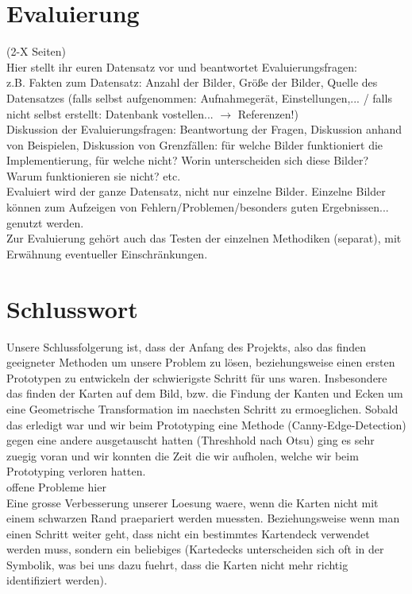\documentclass[paper=A4, deutsch]{scrartcl}
\begin{document}
\section{Evaluierung}
(2-X Seiten)\\
Hier stellt ihr euren Datensatz vor und beantwortet Evaluierungsfragen:\\
z.B. Fakten zum Datensatz: Anzahl der Bilder, Größe der Bilder, Quelle des Datensatzes (falls selbst aufgenommen: Aufnahmegerät, Einstellungen,... / falls nicht selbst erstellt: Datenbank vostellen... $\to$ Referenzen!)\\
Diskussion der Evaluierungsfragen: Beantwortung der Fragen, Diskussion anhand von Beispielen, Diskussion von Grenzfällen: für welche Bilder funktioniert die Implementierung, für welche nicht? Worin unterscheiden sich diese Bilder? Warum funktionieren sie nicht? etc.\\
Evaluiert wird der ganze Datensatz, nicht nur einzelne Bilder. Einzelne Bilder können zum Aufzeigen von Fehlern/Problemen/besonders guten Ergebnissen... genutzt werden.\\
Zur Evaluierung gehört auch das Testen der einzelnen Methodiken (separat), mit Erwähnung eventueller Einschränkungen.

\section{Schlusswort}
Unsere Schlussfolgerung ist, dass der Anfang des Projekts, also das finden geeigneter Methoden um unsere Problem zu lösen,
beziehungsweise einen ersten Prototypen zu entwickeln der schwierigste Schritt für uns waren. Insbesondere das finden der Karten
auf dem Bild, bzw. die Findung der Kanten und Ecken um eine Geometrische Transformation im naechsten Schritt zu ermoeglichen.
Sobald das erledigt war und wir beim Prototyping eine Methode (Canny-Edge-Detection) gegen eine andere ausgetauscht hatten (Threshhold nach Otsu)
ging es sehr zuegig voran und wir konnten die Zeit die wir aufholen, welche wir beim Prototyping verloren hatten.
\\
offene Probleme hier
\\
Eine grosse Verbesserung unserer Loesung waere, wenn die Karten nicht mit einem schwarzen Rand
praepariert werden muessten. Beziehungsweise wenn man einen Schritt weiter geht, dass nicht ein
bestimmtes Kartendeck verwendet werden muss, sondern ein beliebiges (Kartedecks unterscheiden sich oft
in der Symbolik, was bei uns dazu fuehrt, dass die Karten nicht mehr richtig identifiziert werden).



\end{document}
